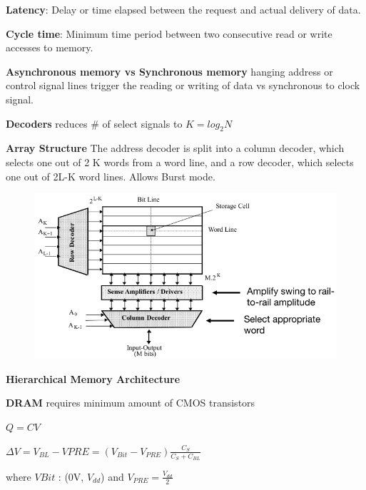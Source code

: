 \documentclass[english]{latex4ei/latex4ei_sheet}
\begin{document}
\textbf{Latency}: Delay or time elapsed between the request and actual delivery of data.

\textbf{Cycle time}: Minimum time period between two consecutive read or write accesses
to memory.

\textbf{Asynchronous memory vs Synchronous memory} hanging address or
control signal lines trigger the reading or writing of data vs synchronous to clock signal.

\textbf{Decoders} reduces \# of select signals to $K = log_2 N$

\textbf{Array Structure} The address decoder is split into a column decoder, which selects one out of 2 K words from a word line, and a row decoder, which selects one out of 2L-K word lines. Allows Burst mode.
\begin{figure}
	\centering
	\includegraphics[width=1\linewidth]{images//5.Memory/ArrayStructure.png}
\end{figure}

\textbf{Hierarchical Memory Architecture}

\textbf{DRAM} requires minimum amount of CMOS transistors

$Q = C V$

$\Delta V = V_{BL} - V{PRE} = (V_{Bit} - V_{PRE})\frac{C_S}{C_S + C_{BL}}$

where $V{Bit}$ : (0V, $V_{dd}$) and $V_{PRE} = \frac{V_{dd}}{2}$
\end{document}
